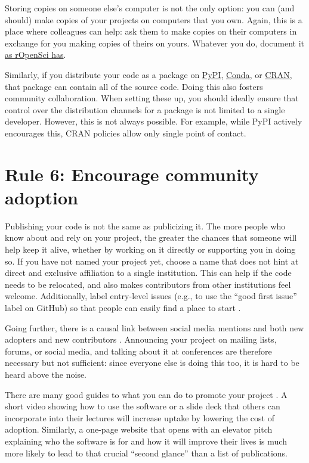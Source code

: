 \documentclass[10pt,letterpaper]{article}
\begin{document}
Storing copies on someone else's computer is not the only option:
you can (and should) make copies of your projects on computers that you own.
Again,
this is a place where colleagues can help:
ask them to make copies on their computers in exchange for you making copies of theirs on yours.
Whatever you do,
document it \href{https://ropensci.org/blog/2022/03/22/safeguards-and-backups-for-github-organizations/}{as rOpenSci has}.

Similarly,
if you distribute your code as a package on \href{https://pypi.org/}{PyPI},
\href{https://anaconda.org/anaconda/conda}{Conda},
or \href{https://cran.r-project.org/}{CRAN},
that package can contain all of the source code.
Doing this also fosters community collaboration.
When setting these up, you should ideally ensure that control over the distribution channels for a package is not limited to a single developer.
However, this is not always possible.
For example,
while PyPI actively encourages this,
CRAN policies allow only single point of contact.

\section*{Rule 6: Encourage community adoption}

Publishing your code is not the same as publicizing it.
The more people who know about and rely on your project,
the greater the chances that someone will help keep it alive,
whether by working on it directly or supporting you in doing so.
If you have not named your project yet,
choose a name that does not hint at direct and exclusive affiliation to a single institution.
This can help if the code needs to be relocated,
and also makes contributors from other institutions feel welcome.
Additionally,
label entry-level issues
(e.g., to use the ``good first issue'' label on GitHub)
so that people can easily find a place to start \cite{Steinmacher2015}.

Going further,
there is a causal link between social media mentions and both new adopters and new contributors \cite{Fang2022}.
Announcing your project on mailing lists, forums, or social media,
and talking about it at conferences are therefore necessary but not sufficient:
since everyone else is doing this too,
it is hard to be heard above the noise.

There are many good guides to what you can do to promote your project \cite{Kuchner2011,BelliniSaibene2024}.
A short video showing how to use the software
or a slide deck that others can incorporate into their lectures
will increase uptake by lowering the cost of adoption.
Similarly,
a one-page website that opens with an elevator pitch
explaining who the software is for
and how it will improve their lives
is much more likely to lead to that crucial ``second glance''
than a list of publications.
\end{document}
